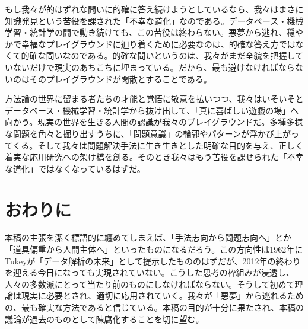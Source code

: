 もし我々が的はずれな問いに的確に答え続けようとしているなら、我々はまさに知識発見という苦役を課された「不幸な道化」なのである。データベース・機械学習・統計学の間で動き続けても、この苦役は終わらない。悪夢から逃れ、穏やかで幸福なプレイグラウンドに辿り着くために必要なのは、的確な答え方ではなくて的確な問いなのである。的確な問いというのは、我々がまだ全貌を把握していないだけで現実のあちこちに埋まっている。だから、最も避けなければならないのはそのプレイグラウンドが閑散とすることである。

方法論の世界に留まる者たちの才能と覚悟に敬意を払いつつ、我々はいそいそとデータベース・機械学習・統計学から抜け出して、「真に喜ばしい遊戯の場」へ向かう。現実の世界を生きる人間の認識が我々のプレイグラウンドだ。多種多様な問題を色々と掘り出すうちに、「問題意識」の輪郭やパターンが浮かび上がってくる。そして我々は問題解決手法に生き生きとした明確な目的を与え、正しく着実な応用研究への架け橋を創る。そのとき我々はもう苦役を課せられた「不幸な道化」ではなくなっているはずだ。

\section{おわりに}
本稿の主張を潔く標語的に纏めてしまえば、「手法志向から問題志向へ」とか「道具偏重から人間主体へ」といったものになるだろう。この方向性は1962年にTukeyが「データ解析の未来」として提示したもののはずだが、2012年の終わりを迎える今日になっても実現されていない。こうした思考の枠組みが浸透し、人々の多数派にとって当たり前のものにしなければならない。そうして初めて理論は現実に必要とされ、適切に応用されていく。我々が「悪夢」から逃れるための、最も確実な方法であると信じている。本稿の目的が十分に果たされ、本稿の議論が過去のものとして陳腐化することを切に望む。

